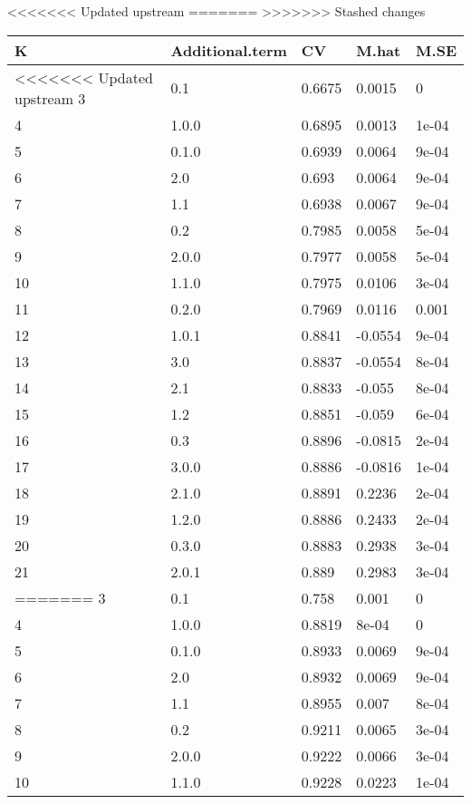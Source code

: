 <<<<<<< Updated upstream
=======
>>>>>>> Stashed changes
\begin{table}[ht]
\centering
\begin{tabular}{lllll}
  \hline
K & Additional.term & CV & M.hat & M.SE \\ 
  \hline
<<<<<<< Updated upstream
3 & 0.1 & 0.6675 & 0.0015 & 0 \\ 
  4 & 1.0.0 & 0.6895 & 0.0013 & 1e-04 \\ 
  5 & 0.1.0 & 0.6939 & 0.0064 & 9e-04 \\ 
  6 & 2.0 & 0.693 & 0.0064 & 9e-04 \\ 
  7 & 1.1 & 0.6938 & 0.0067 & 9e-04 \\ 
  8 & 0.2 & 0.7985 & 0.0058 & 5e-04 \\ 
  9 & 2.0.0 & 0.7977 & 0.0058 & 5e-04 \\ 
  10 & 1.1.0 & 0.7975 & 0.0106 & 3e-04 \\ 
  11 & 0.2.0 & 0.7969 & 0.0116 & 0.001 \\ 
  12 & 1.0.1 & 0.8841 & -0.0554 & 9e-04 \\ 
  13 & 3.0 & 0.8837 & -0.0554 & 8e-04 \\ 
  14 & 2.1 & 0.8833 & -0.055 & 8e-04 \\ 
  15 & 1.2 & 0.8851 & -0.059 & 6e-04 \\ 
  16 & 0.3 & 0.8896 & -0.0815 & 2e-04 \\ 
  17 & 3.0.0 & 0.8886 & -0.0816 & 1e-04 \\ 
  18 & 2.1.0 & 0.8891 & 0.2236 & 2e-04 \\ 
  19 & 1.2.0 & 0.8886 & 0.2433 & 2e-04 \\ 
  20 & 0.3.0 & 0.8883 & 0.2938 & 3e-04 \\ 
  21 & 2.0.1 & 0.889 & 0.2983 & 3e-04 \\ 
=======
3 & 0.1 & 0.758 & 0.001 & 0 \\ 
  4 & 1.0.0 & 0.8819 & 8e-04 & 0 \\ 
  5 & 0.1.0 & 0.8933 & 0.0069 & 9e-04 \\ 
  6 & 2.0 & 0.8932 & 0.0069 & 9e-04 \\ 
  7 & 1.1 & 0.8955 & 0.007 & 8e-04 \\ 
  8 & 0.2 & 0.9211 & 0.0065 & 3e-04 \\ 
  9 & 2.0.0 & 0.9222 & 0.0066 & 3e-04 \\ 
  10 & 1.1.0 & 0.9228 & 0.0223 & 1e-04 \\ 

\end{tabular}
\end{table}

